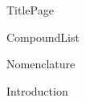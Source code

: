 \documentclass[10pt,a4paper]{article}
\begin{document}
{TitlePage}

{CompoundList}

\tableofcontents


\newpage
{Nomenclature}
\printnomenclature

\newpage
{Introduction}

\newpage
{}


\listoftodos
\end{document}
